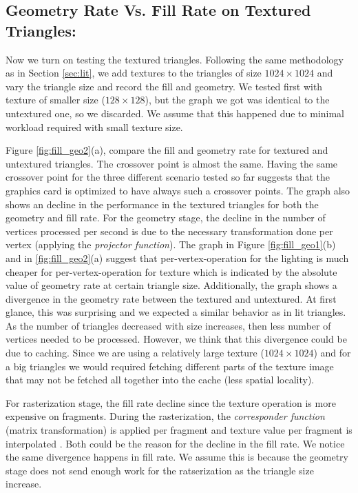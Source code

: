 \subsection{Geometry Rate Vs. Fill Rate on Textured Triangles:}
Now we turn on testing the textured triangles. Following the same methodology as in Section \ref{sec:lit}, we add textures to the triangles of size $1024\times1024$ and vary the triangle size and record the fill and geometry. We tested first with texture of smaller size ($128\times128$), but the graph we got was identical to the untextured one, so we discarded. We assume that this happened due to minimal workload required with small texture size. 

Figure \ref{fig:fill_geo2}(a), compare the fill and geometry rate for textured and untextured triangles. The crossover point is almost the same. Having the same crossover point for the three different scenario tested so far suggests that the graphics card is optimized to have always such a crossover points. The graph also shows an decline in the performance in the textured triangles for both the geometry and fill rate. For the geometry stage, the decline in the number of vertices processed per second is due to the necessary transformation done per vertex (applying the \emph{projector function}\cite{akenine2008real}). The graph in Figure \ref{fig:fill_geo1}(b) and in \ref{fig:fill_geo2}(a) suggest that per-vertex-operation for the lighting is much cheaper for per-vertex-operation for texture which is indicated by the absolute value of geometry rate at certain triangle size. Additionally, the graph shows a divergence in the geometry rate between the textured and untextured. At first glance, this was surprising and we expected a similar behavior as in lit triangles. As the number of triangles decreased with size increases, then less number of vertices needed to be processed. However, we think that this divergence could be due to caching. Since we are using a relatively large texture ($1024\times1024$) and for a big triangles we would required fetching different parts of the texture image that may not be fetched all together into the cache (less spatial locality). 

For rasterization stage, the fill rate decline since the texture operation is more expensive on fragments. During the rasterization, the \emph{corresponder function} (matrix transformation) is applied per fragment and texture value per fragment is interpolated \cite{akenine2008real}. Both could be the reason for the decline in the fill rate. We notice the same divergence happens in fill rate. We assume this is because the geometry stage does not send enough work for the ratserization as the triangle size increase. 

